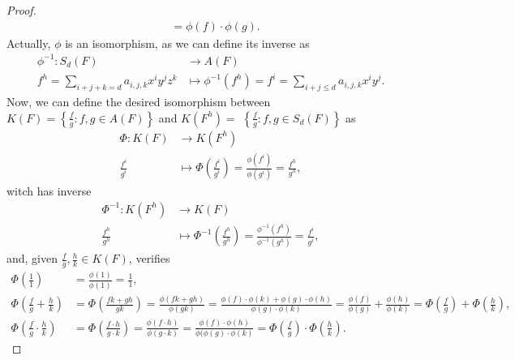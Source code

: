 \documentclass[11pt,a4paper]{article}
\begin{document}
\begin{proof}
\begin{align*}
    &= \phi(f) \cdot \phi(g).
  \end{align*}
  Actually, $ \phi $ is an isomorphism, as we can define its inverse as
  \begin{align*}
    \phi^{-1}: S_d(F) &\longrightarrow A(F) \\
    f^h = \sum_{i+j+k = d} a_{i,j,k} x^i y^j z^k &\longmapsto \phi^{-1} (f^h) = f^i = \sum_{i+j \leq d} a_{i,j,k} x^i y^j.
  \end{align*}
  Now, we can define the desired isomorphism between $ K(F) = \left\{\frac{f}{g}: f, g \in A(F)\right\} $ and $ K(F^h) = $ $ \left\{\frac{f}{g}: f, g \in S_d(F)\right\} $ as
  \begin{align*}
    \Phi: K(F) &\longrightarrow K(F^h) \\
    \frac{f^i}{g^i} &\longmapsto \Phi \left(\frac{f^i}{g^i}\right)= \frac{\phi(f^i)}{\phi(g^i)} = \frac{f^h}{g^h},
  \end{align*}
  witch has inverse
  \begin{align*}
    \Phi^{-1}: K(F^h) &\longrightarrow K(F) \\
    \frac{f^h}{g^h} &\longmapsto \Phi^{-1} \left(\frac{f^h}{g^h}\right)= \frac{\phi^{-1}(f^h)}{\phi^{-1}(g^h)} = \frac{f^i}{g^i},
  \end{align*}
  and, given $ \frac{f}{g}, \frac{h}{k} \in K(F) $, verifies
  \begin{align*}
    \Phi(\frac{1}{1}) &= \frac{\phi(1)}{\phi(1)} = \frac{1}{1}, \\
    \Phi(\frac{f}{g} + \frac{h}{k}) &= \Phi(\frac{fk + gh}{gk}) = \frac{\phi(fk + gh)}{\phi(gk)} = \frac{\phi(f) \cdot \phi(k) + \phi(g) \cdot\phi(h)}{\phi(g) \cdot \phi(k)} = \frac{\phi(f)}{\phi(g)} + \frac{\phi(h)}{\phi(k)} = \Phi(\frac{f}{g}) + \Phi(\frac{h}{k}), \\
    \Phi(\frac{f}{g} \cdot \frac{h}{k}) &= \Phi(\frac{f\cdot h}{g \cdot k}) = \frac{\phi(f\cdot h)}{\phi(g \cdot k)} = \frac{\phi(f) \cdot \phi(h)}{\phi(\phi(g) \cdot \phi(k)} = \Phi(\frac{f}{g})\cdot \Phi(\frac{h}{k}).
  \end{align*}
\end{proof}
\end{document}
